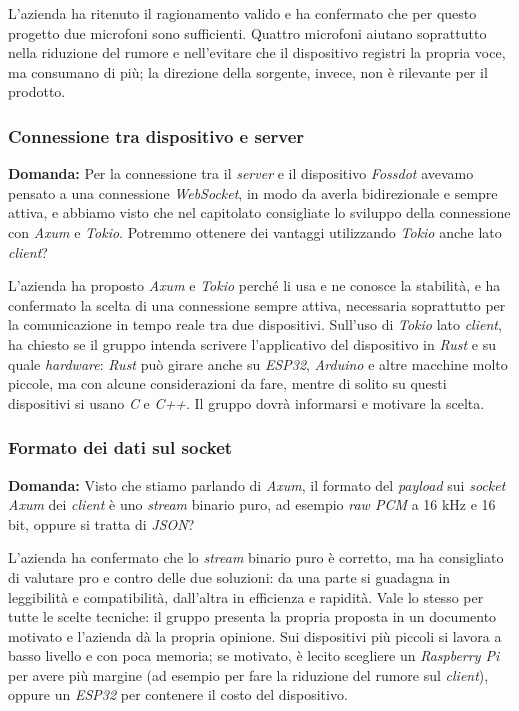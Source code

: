 \documentclass[12pt,a4paper]{article}
\begin{document}
L'azienda ha ritenuto il ragionamento valido e ha confermato che per questo progetto due microfoni sono sufficienti. Quattro microfoni aiutano soprattutto nella riduzione del rumore e nell'evitare che il dispositivo registri la propria voce, ma consumano di più; la direzione della sorgente, invece, non è rilevante per il prodotto.

\subsubsection{Connessione tra dispositivo e server}

\textbf{Domanda:} Per la connessione tra il \emph{server} e il dispositivo \emph{Fossdot} avevamo pensato a una connessione \emph{WebSocket}, in modo da averla bidirezionale e sempre attiva, e abbiamo visto che nel capitolato consigliate lo sviluppo della connessione con \emph{Axum} e \emph{Tokio}. Potremmo ottenere dei vantaggi utilizzando \emph{Tokio} anche lato \emph{client}?

L'azienda ha proposto \emph{Axum} e \emph{Tokio} perché li usa e ne conosce la stabilità, e ha confermato la scelta di una connessione sempre attiva, necessaria soprattutto per la comunicazione in tempo reale tra due dispositivi. Sull'uso di \emph{Tokio} lato \emph{client}, ha chiesto se il gruppo intenda scrivere l'applicativo del dispositivo in \emph{Rust} e su quale \emph{hardware}: \emph{Rust} può girare anche su \emph{ESP32}, \emph{Arduino} e altre macchine molto piccole, ma con alcune considerazioni da fare, mentre di solito su questi dispositivi si usano \emph{C} e \emph{C++}. Il gruppo dovrà informarsi e motivare la scelta.

\subsubsection{Formato dei dati sul socket}

\textbf{Domanda:} Visto che stiamo parlando di \emph{Axum}, il formato del \emph{payload} sui \emph{socket} \emph{Axum} dei \emph{client} è uno \emph{stream} binario puro, ad esempio \emph{raw PCM} a 16 kHz e 16 bit, oppure si tratta di \emph{JSON}?

L'azienda ha confermato che lo \emph{stream} binario puro è corretto, ma ha consigliato di valutare pro e contro delle due soluzioni: da una parte si guadagna in leggibilità e compatibilità, dall'altra in efficienza e rapidità. Vale lo stesso per tutte le scelte tecniche: il gruppo presenta la propria proposta in un documento motivato e l'azienda dà la propria opinione. Sui dispositivi più piccoli si lavora a basso livello e con poca memoria; se motivato, è lecito scegliere un \emph{Raspberry Pi} per avere più margine (ad esempio per fare la riduzione del rumore sul \emph{client}), oppure un \emph{ESP32} per contenere il costo del dispositivo.
\end{document}
